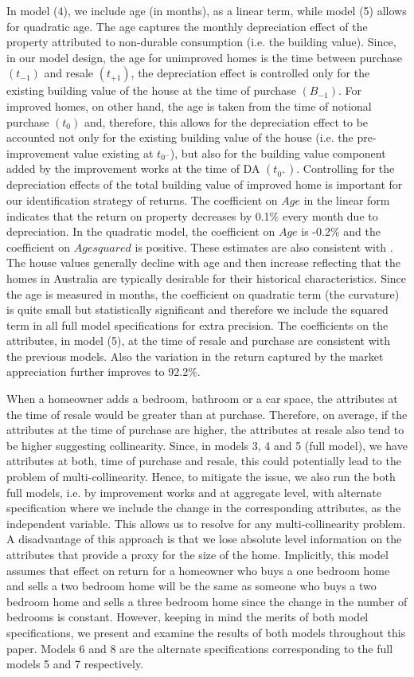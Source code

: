 \documentclass[AEJ,reqno, draftmode]{AEA} %
\begin{document}
In model (4), we include age (in months), as a linear term, while model (5) allows for quadratic age. The age captures the monthly depreciation effect of the property attributed to non-durable consumption (i.e. the building value). Since, in our model design, the age for unimproved homes is the time between purchase $(t_{-1})$ and resale $(t_{+1})$, the depreciation effect is controlled only for the existing building value of the house at the time of purchase $(B_{-1})$. For improved homes, on other hand, the age is taken from the time of notional purchase $(t_0)$ and, therefore, this allows for the depreciation effect to be accounted not only for the existing building value of the house (i.e. the pre-improvement value existing at $t_{0^-}$), but also for the building value component added by the improvement works at the time of DA $(t_{0^+})$. Controlling for the depreciation effects of the total building value of improved home is important for our identification strategy of returns. The coefficient on $Age$ in the linear form indicates that the return on property decreases by 0.1\% every month due to depreciation. In the quadratic model, the coefficient on $Age$ is -0.2\% and the coefficient on $Age squared$ is positive. These estimates are also consistent with \citep{kiel1995effect}. The house values generally decline with age and then increase reflecting that the homes in Australia are typically desirable for their historical characteristics. Since the age is measured in months, the coefficient on quadratic term (the curvature) is quite small but statistically significant and therefore we include the squared term in all full model specifications for extra precision. The coefficients on the attributes, in model (5), at the time of resale and purchase are consistent with the previous models. Also the variation in the return captured by the market appreciation further improves to 92.2\%.

When a homeowner adds a bedroom, bathroom or a car space, the attributes at the time of resale would be greater than at purchase. Therefore, on average, if the attributes at the time of purchase are higher, the attributes at resale also tend to be higher suggesting collinearity. Since, in models 3, 4 and 5 (full model), we have attributes at both, time of purchase and resale, this could potentially lead to the problem of multi-collinearity. Hence, to mitigate the issue, we also run the both full models, i.e. by improvement works and at aggregate level, with alternate specification where we include the change in the corresponding attributes, as the independent variable. This allows us to resolve for any multi-collinearity problem. A disadvantage of this approach is that we lose absolute level information on the attributes that provide a proxy for the size of the home. Implicitly, this model assumes that effect on return for a homeowner who buys a one bedroom home and sells a two bedroom home will be the same as someone who buys a two bedroom home and sells a three bedroom home since the change in the number of bedrooms is constant. However, keeping in mind the merits of both model specifications, we present and examine the results of both models throughout this paper. Models 6 and 8 are the alternate specifications corresponding to the full models 5 and 7 respectively.
\end{document}
